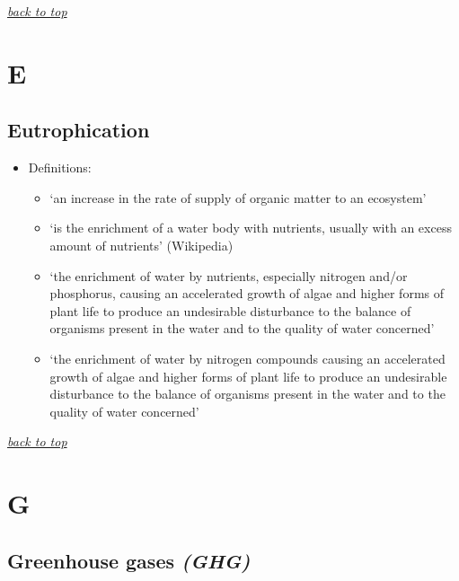 \documentclass[]{book}
\providecommand{\tightlist}{%
  \setlength{\itemsep}{0pt}\setlength{\parskip}{0pt}}
\theoremstyle{definition}
\theoremstyle{definition}
\theoremstyle{definition}
\theoremstyle{remark}
\begin{document}
\emph{\protect\hyperlink{top}{back to top}}

\section{E}\label{e}

\hypertarget{eutrophication}{\subsection{Eutrophication}\label{eutrophication}}

\begin{itemize}
\tightlist
\item
  Definitions:

  \begin{itemize}
  \tightlist
  \item
    `an increase in the rate of supply of organic matter to an
    ecosystem' \citep{Nixon1995-th}
  \item
    `is the enrichment of a water body with nutrients, usually with an
    excess amount of nutrients' (Wikipedia)
  \item
    `the enrichment of water by nutrients, especially nitrogen and/or
    phosphorus, causing an accelerated growth of algae and higher forms
    of plant life to produce an undesirable disturbance to the balance
    of organisms present in the water and to the quality of water
    concerned' \citep{Anonymous1991-ho}
  \item
    `the enrichment of water by nitrogen compounds causing an
    accelerated growth of algae and higher forms of plant life to
    produce an undesirable disturbance to the balance of organisms
    present in the water and to the quality of water concerned'
    \citep{Anonymous1991-xb}
  \end{itemize}
\end{itemize}

\emph{\protect\hyperlink{top}{back to top}}

\section{G}\label{g}

\subsection{\texorpdfstring{Greenhouse gases
\emph{(GHG)}}{Greenhouse gases (GHG)}}\label{greenhouse-gases-ghg}
\end{document}
